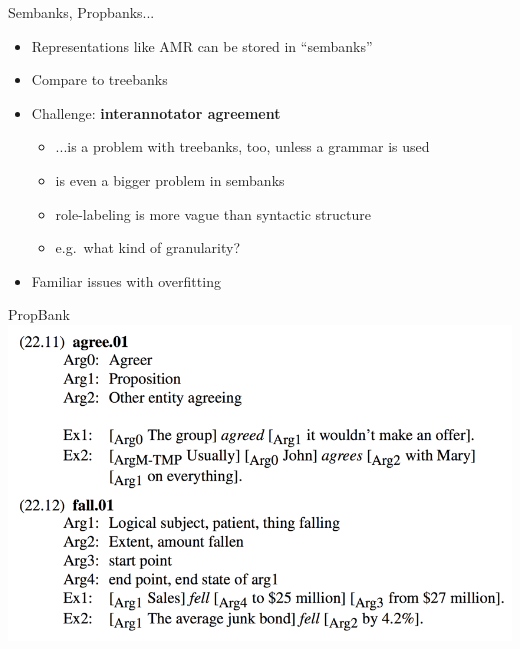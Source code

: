 \documentclass{beamer}
\begin{document}
\begin{frame}{Sembanks, Propbanks...}
  \begin{itemize}
  \item Representations like AMR can be stored in ``sembanks''
  \item Compare to treebanks
  \item Challenge: {\bf interannotator agreement}
    \begin{itemize}
    \item ...is a problem with treebanks, too, unless a grammar is used
    \item is even a bigger problem in sembanks
    \item role-labeling is more vague than syntactic structure
    \item e.g.\ what kind of granularity?
    \end{itemize}
  \item Familiar issues with overfitting
  \end{itemize}
\end{frame}

\begin{frame}{PropBank}
  \includegraphics[width=\textwidth]{figures/propbank}
\end{frame}
\end{document}
